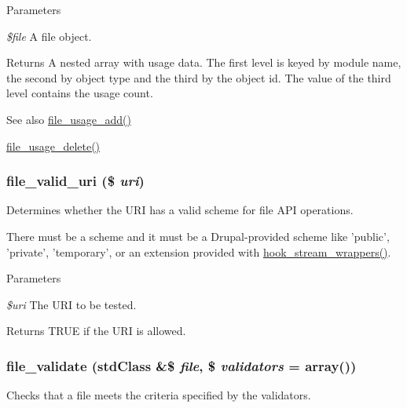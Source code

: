 \begin{DoxyParams}{Parameters}
\item[{\em \$file}]A file object.\end{DoxyParams}
\begin{DoxyReturn}{Returns}
A nested array with usage data. The first level is keyed by module name, the second by object type and the third by the object id. The value of the third level contains the usage count.
\end{DoxyReturn}
\begin{DoxySeeAlso}{See also}
\hyperlink{group__file_ga41a98960234fa8f802cfc1c4c769ae05}{file\_\-usage\_\-add()} 

\hyperlink{group__file_gaf8562c4494373ec51079bb0999a8ae3a}{file\_\-usage\_\-delete()} 
\end{DoxySeeAlso}
\hypertarget{group__file_gad84d226f677dd5b6e53519026b7de67e}{
\subsubsection[{file\_\-valid\_\-uri}]{\setlength{\rightskip}{0pt plus 5cm}file\_\-valid\_\-uri (\$ {\em uri})}}
\label{group__file_gad84d226f677dd5b6e53519026b7de67e}
Determines whether the URI has a valid scheme for file API operations.

There must be a scheme and it must be a Drupal-\/provided scheme like 'public', 'private', 'temporary', or an extension provided with \hyperlink{group__hooks_ga6fadcf625a4766e7f0d97b1628b294dc}{hook\_\-stream\_\-wrappers()}.


\begin{DoxyParams}{Parameters}
\item[{\em \$uri}]The URI to be tested.\end{DoxyParams}
\begin{DoxyReturn}{Returns}
TRUE if the URI is allowed. 
\end{DoxyReturn}
\hypertarget{group__file_ga9edf58fdc552d61247bbf8322c434abf}{
\subsubsection[{file\_\-validate}]{\setlength{\rightskip}{0pt plus 5cm}file\_\-validate (stdClass \&\$ {\em file}, \/  \$ {\em validators} = {\ttfamily array()})}}
\label{group__file_ga9edf58fdc552d61247bbf8322c434abf}
Checks that a file meets the criteria specified by the validators.

